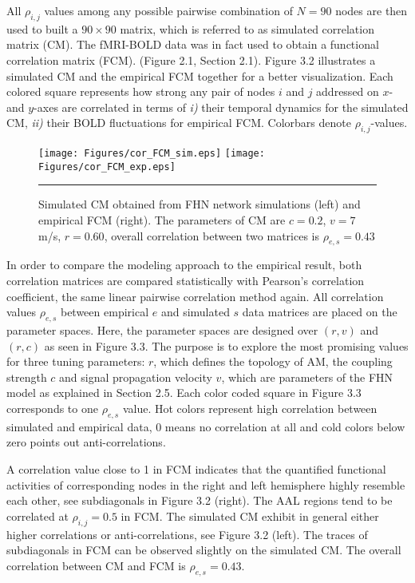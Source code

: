 All $\rho_{i,j}$ values among any possible pairwise combination of $N=90$ nodes are then used to built a $90\times 90$  matrix, which is referred to as simulated correlation matrix (CM). The fMRI-BOLD data was in fact used to obtain a functional correlation matrix (FCM). (Figure 2.1, Section 2.1). Figure 3.2 illustrates a simulated CM and the empirical FCM together for a better visualization. Each colored square represents how strong any pair of nodes $i$ and $j$ addressed on $x$- and $y$-axes are correlated in terms of \textit{i)} their temporal dynamics for the simulated CM, \textit{ii)} their BOLD fluctuations for empirical FCM. Colorbars denote $\rho_{i,j}$-values.


\begin{figure}[htbp]
 
  \centering
	 \texttt{[image: Figures/cor\_FCM\_sim.eps]} 
   	 \texttt{[image: Figures/cor\_FCM\_exp.eps]} 

    \rule{35em}{0.5pt}
  \caption[High correlated FHN simulation, FCM]{ Simulated CM obtained from FHN network simulations (left) and empirical FCM (right). The parameters of CM are $c=0.2$, $v=7$ m/s, $r=0.60$, overall correlation between two matrices is $\rho_{e,s} = 0.43$}
      \label{fig:High correlated FHN simulation, FCM}
 	
\end{figure}  



In order to compare the modeling approach to the empirical result, both correlation matrices are compared statistically with Pearson's correlation coefficient, the same linear pairwise correlation method again. All correlation values $\rho_{e,s}$ between empirical $e$ and simulated $s$ data matrices are placed on the parameter spaces. Here, the parameter spaces are designed over $(r,v)$ and $(r,c)$ as seen in Figure 3.3. The purpose is to explore the most promising values for three tuning parameters: $r$, which defines the topology of AM, the coupling strength $c$ and signal propagation velocity $v$, which are parameters of the FHN model as explained in Section 2.5.  Each color coded square in Figure 3.3 corresponds to one $\rho_{e,s}$ value. Hot colors represent high correlation between simulated and empirical data, 0 means no correlation at all and cold colors below zero points out anti-correlations.


A correlation value close to 1 in FCM indicates that the quantified functional activities of corresponding nodes in the right and left hemisphere highly resemble each other, see subdiagonals in Figure 3.2 (right). The AAL regions tend to be correlated at $\rho_{i,j}=0.5$ in FCM. The simulated CM exhibit in general either higher correlations or anti-correlations, see Figure 3.2 (left). The traces of subdiagonals in FCM can be observed slightly on the simulated CM. The overall correlation between CM and FCM is $\rho_{e,s}=0.43$. 


